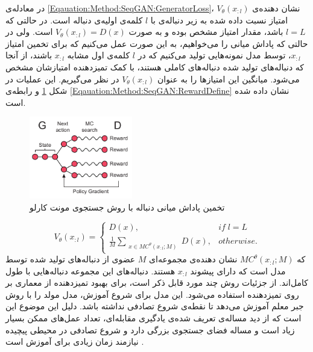 در معادله‌ی 
\ref{Eqauation:Method:SeqGAN:GeneratorLoss}،
$V_\theta(x_{:l})$
نشان دهنده‌ی امتیاز نسبت داده شده به زیر دنباله‌ی با $l$ کلمه‌ی اولیه‌ی دنباله است. در حالتی که $l=L$ باشد، مقدار امتیاز مشخص بوده و به صورت 
$V_\theta(x_{:l}) = D(x)$
است. ولی در حالتی که پاداش میانی را می‌خواهیم، به این صورت عمل می‌کنیم که برای تخمین امتیاز
$x_{:l}$، 
 توسط مدل نمونه‌هایی تولید می‌کنیم که در $l$ کلمه‌ی اول مشابه $x_{:l}$ باشند، از آنجا که دنباله‌های تولید شده دنباله‌های کاملی هستند، با کمک تمیزدهنده امتیازشان مشخص می‌شود. میانگین این امتیاز‌ها را به عنوان 
$V_\theta(x_{:l})$
در نظر می‌گیریم. این عملیات در شکل 
\ref{Figure:SeqGAN:MontCarloSearch}
و رابطه‌ی
\ref{Eqauation:Method:SeqGAN:RewardDefine}
نشان داده شده است.
 \begin{figure}[!htb]
 	\centering
 	\includegraphics[width=0.4\textwidth]{images/ArchitectureSeqGANSearch.pdf} 
 	\caption[تخمین پاداش میانی دنباله با روش جستجوی مونت کارلو]{
 		تخمین پاداش میانی دنباله با روش جستجوی مونت کارلو
 		\cite{SeqGAN}
 		}
 	\label{Figure:SeqGAN:MontCarloSearch}
 \end{figure}

 \begin{equation}\label{Eqauation:Method:SeqGAN:RewardDefine}
 V_\theta(x_{:l}) = 
 \begin{cases}
D(x)  ,&   if \; l = L\\
 \frac{1}{M} \sum_{\substack{x \in MC^{\theta}(x_{:l}; M)}}D(x) ,&  otherwise .
 \end{cases}
 \end{equation}
 که
 $MC^{\theta}(x_{:l}; M)$
 نشان دهنده‌ی مجموعه‌ای $M$ عضوی از دنباله‌های تولید شده توسط مدل است که دارای پیشوند
 $x_{:l}$
 هستند. دنباله‌های این مجموعه دنباله‌هایی با طول کامل‌اند. 
\newline
از جزئیات روش
چند مورد قابل ذکر است، برای بهبود تمیزدهنده از معماری
  \cite{Srivastava15Highway}
 بر روی تمیزدهنده استفاده می‌شود. 
این مدل برای شروع آموزش، مدل مولد را با روش جبر معلم آموزش می‌دهد تا نقطه‌ی شروع تصادفی نداشته باشد. دلیل این موضوع این است که از دید مساله‌ی تعریف شده‌ی یادگیری مقابله‌ای، تعداد عمل‌های ممکن بسیار زیاد است و مساله فضای جستجوی بزرگی دارد و شروع تصادفی در محیطی پیچیده نیازمند زمان زیادی برای آموزش است
\cite{Che2017}.
